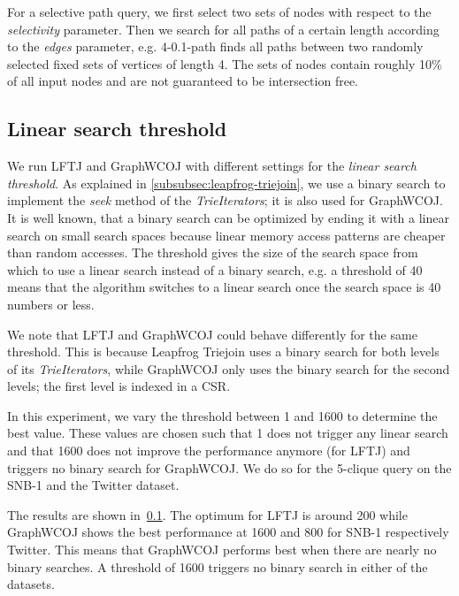 For a selective path query, we first select two sets of nodes with respect to the \textit{selectivity} parameter.
Then we search for all paths of a certain length according to the \textit{edges} parameter, e.g. 4-0.1-path finds all
paths between two randomly selected fixed sets of vertices of length 4.
The sets of nodes contain roughly 10\% of all input nodes and are
not guaranteed to be intersection free.

\subsection{Linear search threshold}\label{subsec:linear-search-threshold}

We run \textsc{LFTJ} and GraphWCOJ with different settings for the \textit{linear search threshold}.
As explained in \cref{subsubsec:leapfrog-triejoin}, we use a binary search to implement the \textit{seek}
method of the \textit{TrieIterators};
it is also used for GraphWCOJ.
It is well known, that a binary search can be optimized by ending it with a linear search on small
search spaces because linear memory access patterns are cheaper than random accesses.
The threshold gives the size of the search space from which to use a linear search instead of
a binary search, e.g. a threshold of 40 means that the algorithm switches to a linear search
once the search space is 40 numbers or less.

We note that \textsc{LFTJ} and GraphWCOJ could behave differently for the same threshold.
This is because Leapfrog Triejoin uses a binary search for both levels of its \textit{TrieIterators},
while GraphWCOJ only uses the binary search for the second levels;
the first level is indexed in a \textsc{CSR}.

In this experiment, we vary the threshold between 1 and 1600 to determine the best value.
These values are chosen such that 1 does not trigger any linear search and that 1600
does not improve the performance anymore (for \textsc{LFTJ}) and triggers no
binary search for GraphWCOJ.
We do so for the 5-clique query on the SNB-1 and the Twitter dataset.

The results are shown in~\cref{subsec:linear-search-threshold}.
The optimum for LFTJ is around 200 while GraphWCOJ shows the best performance at 1600 and 800 for
SNB-1 respectively Twitter.
This means that GraphWCOJ performs best when there are nearly no binary searches.
A threshold of 1600 triggers no binary search in either of the datasets.



